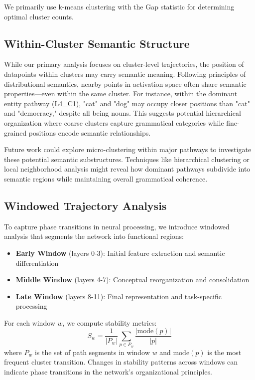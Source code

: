 We primarily use k-means clustering with the Gap statistic for determining optimal cluster counts.

\subsection{Within-Cluster Semantic Structure}

While our primary analysis focuses on cluster-level trajectories, the position of datapoints within clusters may carry semantic meaning. Following principles of distributional semantics, nearby points in activation space often share semantic properties—even within the same cluster. For instance, within the dominant entity pathway (L4\_C1), "cat" and "dog" may occupy closer positions than "cat" and "democracy," despite all being nouns. This suggests potential hierarchical organization where coarse clusters capture grammatical categories while fine-grained positions encode semantic relationships.

Future work could explore micro-clustering within major pathways to investigate these potential semantic substructures. Techniques like hierarchical clustering or local neighborhood analysis might reveal how dominant pathways subdivide into semantic regions while maintaining overall grammatical coherence.

\subsection{Windowed Trajectory Analysis}

To capture phase transitions in neural processing, we introduce windowed analysis that segments the network into functional regions:
\begin{itemize}
    \item \textbf{Early Window} (layers 0-3): Initial feature extraction and semantic differentiation
    \item \textbf{Middle Window} (layers 4-7): Conceptual reorganization and consolidation
    \item \textbf{Late Window} (layers 8-11): Final representation and task-specific processing
\end{itemize}

For each window $w$, we compute stability metrics:
$$S_w = \frac{1}{|P_w|} \sum_{p \in P_w} \frac{|\text{mode}(p)|}{|p|}$$
where $P_w$ is the set of path segments in window $w$ and $\text{mode}(p)$ is the most frequent cluster transition. Changes in stability patterns across windows can indicate phase transitions in the network's organizational principles.



